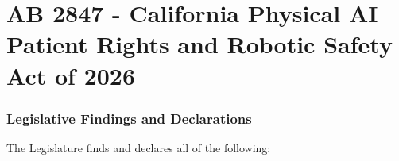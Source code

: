 
\part{AB 2847 - California Physical AI Patient Rights and Robotic Safety Act of 2026}
\setcounter{section}{0}

\section{Legislative Findings and Declarations}

The Legislature finds and declares all of the following:

